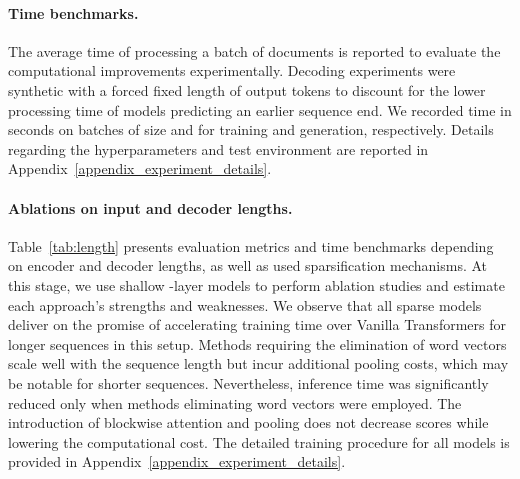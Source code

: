 \documentclass{article}
\begin{document}
\paragraph{Time benchmarks.} The average time of processing a batch of documents is reported to evaluate the computational improvements experimentally. Decoding experiments were synthetic with a forced fixed length of  output tokens to discount for the lower processing time of models predicting an earlier sequence end.
We recorded time in seconds on batches of size  and  for training and generation, respectively. Details regarding the hyperparameters and test environment are reported in Appendix~\ref{appendix_experiment_details}.

\paragraph{Ablations on input and decoder lengths.} Table~\ref{tab:length} presents evaluation metrics and time benchmarks depending on encoder and decoder lengths, as well as used sparsification mechanisms. At this stage, we use shallow -layer models to perform ablation studies and estimate each approach's strengths and weaknesses. We observe that all sparse models deliver on the promise of accelerating training time over Vanilla Transformers for longer sequences in this setup. Methods requiring the elimination of word vectors scale well with the sequence length but incur additional pooling costs, which may be notable for shorter sequences.
Nevertheless, inference time was significantly reduced only when methods eliminating word vectors were employed. The introduction of blockwise attention and pooling does not decrease scores while lowering the computational cost. The detailed training procedure for all models is provided in Appendix~\ref{appendix_experiment_details}.
\end{document}
